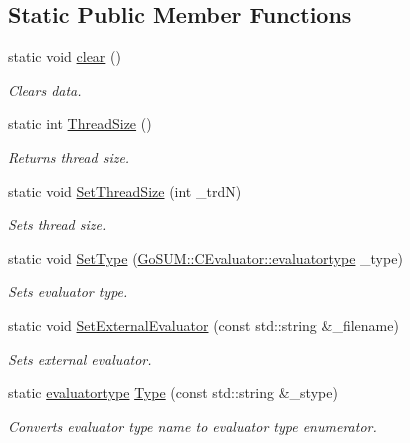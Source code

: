 \subsection*{Static Public Member Functions}
\begin{DoxyCompactItemize}
\item 
static void \hyperlink{class_go_s_u_m_1_1_c_evaluator_a8dd7cff8a0d0ce0857f77769a24b67ab}{clear} ()
\begin{DoxyCompactList}\small\item\em Clears data. \end{DoxyCompactList}\item 
static int \hyperlink{class_go_s_u_m_1_1_c_evaluator_abd38361870902bdcdf41543f1c416e61}{Thread\-Size} ()
\begin{DoxyCompactList}\small\item\em Returns thread size. \end{DoxyCompactList}\item 
static void \hyperlink{class_go_s_u_m_1_1_c_evaluator_a2d37e82e77ebaf2c9dd8fa33bbe5f62a}{Set\-Thread\-Size} (int \-\_\-trd\-N)
\begin{DoxyCompactList}\small\item\em Sets thread size. \end{DoxyCompactList}\item 
static void \hyperlink{class_go_s_u_m_1_1_c_evaluator_af5efaa184dbd5675ffa9fd6e711a5855}{Set\-Type} (\hyperlink{class_go_s_u_m_1_1_c_evaluator_a50058cbf6a2c5b94677045ee02b67db2}{Go\-S\-U\-M\-::\-C\-Evaluator\-::evaluatortype} \-\_\-type)
\begin{DoxyCompactList}\small\item\em Sets evaluator type. \end{DoxyCompactList}\item 
static void \hyperlink{class_go_s_u_m_1_1_c_evaluator_ae5283dc3a7955d23941eff2f5571499c}{Set\-External\-Evaluator} (const std\-::string \&\-\_\-filename)
\begin{DoxyCompactList}\small\item\em Sets external evaluator. \end{DoxyCompactList}\item 
static \hyperlink{class_go_s_u_m_1_1_c_evaluator_a50058cbf6a2c5b94677045ee02b67db2}{evaluatortype} \hyperlink{class_go_s_u_m_1_1_c_evaluator_ac1826721f6a9f7d747d75fc4c95f8b18}{Type} (const std\-::string \&\-\_\-stype)
\begin{DoxyCompactList}\small\item\em Converts evaluator type name to evaluator type enumerator. \end{DoxyCompactList}\item 

\end{DoxyCompactItemize}
